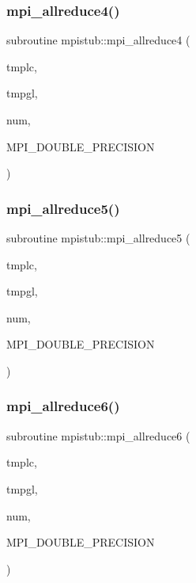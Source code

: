 \mbox{\label{namespacempistub_ad0b3b8a56320b07ec24fdf1a6d012614}} 
\subsubsection{\texorpdfstring{mpi\_allreduce4()}{mpi\_allreduce4()}}
{\footnotesize\ttfamily subroutine mpistub\+::mpi\+\_\+allreduce4 (\begin{DoxyParamCaption}\item[{integer}]{tmplc,  }\item[{integer}]{tmpgl,  }\item[{}]{num,  }\item[{}]{M\+P\+I\+\_\+\+D\+O\+U\+B\+L\+E\+\_\+\+P\+R\+E\+C\+I\+S\+I\+ON }\end{DoxyParamCaption})}

\mbox{\label{namespacempistub_a1d326fcb72261d5c91c9f31bfdeae961}} 
\subsubsection{\texorpdfstring{mpi\_allreduce5()}{mpi\_allreduce5()}}
{\footnotesize\ttfamily subroutine mpistub\+::mpi\+\_\+allreduce5 (\begin{DoxyParamCaption}\item[{double precision, dimension(\+:,\+:)}]{tmplc,  }\item[{double precision, dimension(\+:,\+:)}]{tmpgl,  }\item[{}]{num,  }\item[{}]{M\+P\+I\+\_\+\+D\+O\+U\+B\+L\+E\+\_\+\+P\+R\+E\+C\+I\+S\+I\+ON }\end{DoxyParamCaption})}

\mbox{\label{namespacempistub_a3a34d1b95074e43d0c79295326059ef2}} 
\subsubsection{\texorpdfstring{mpi\_allreduce6()}{mpi\_allreduce6()}}
{\footnotesize\ttfamily subroutine mpistub\+::mpi\+\_\+allreduce6 (\begin{DoxyParamCaption}\item[{double precision, dimension(\+:,\+:,\+:)}]{tmplc,  }\item[{double precision, dimension(\+:,\+:,\+:)}]{tmpgl,  }\item[{}]{num,  }\item[{}]{M\+P\+I\+\_\+\+D\+O\+U\+B\+L\+E\+\_\+\+P\+R\+E\+C\+I\+S\+I\+ON }\end{DoxyParamCaption})}

